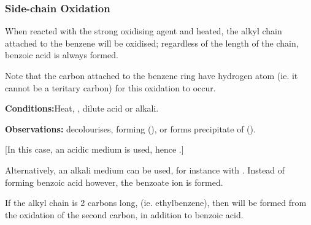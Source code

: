 

			\pagebreak
			\subsubsection{Side-chain Oxidation}

				When reacted with the strong oxidising agent  and heated, the alkyl chain attached to the benzene will be oxidised;
				regardless of the length of the chain, benzoic acid is always formed.

				Note that the carbon attached to the benzene ring  have  hydrogen atom (ie. it cannot be a
				teritary carbon) for this oxidation to occur.

				\vspace{1.5em}

				\vbox{\textbf{Conditions:}\tabto{35mm}Heat, , dilute acid or alkali.}

				\vspace{0.75em}
				\vbox{\textbf{Observations:}\tabto{35mm}  decolourises, forming  (), or
											\tabto{35mm}forms  precipitate of  ().}


				[In this case, an acidic medium is used, hence .]

				Alternatively, an alkali medium can be used, for instance with . Instead of forming benzoic acid however, the
				benzoate ion is formed.





				\pagebreak
				If the alkyl chain is 2 carbons long, (ie. ethylbenzene), then  will be formed from the oxidation of the second carbon,
				in addition to benzoic acid.


